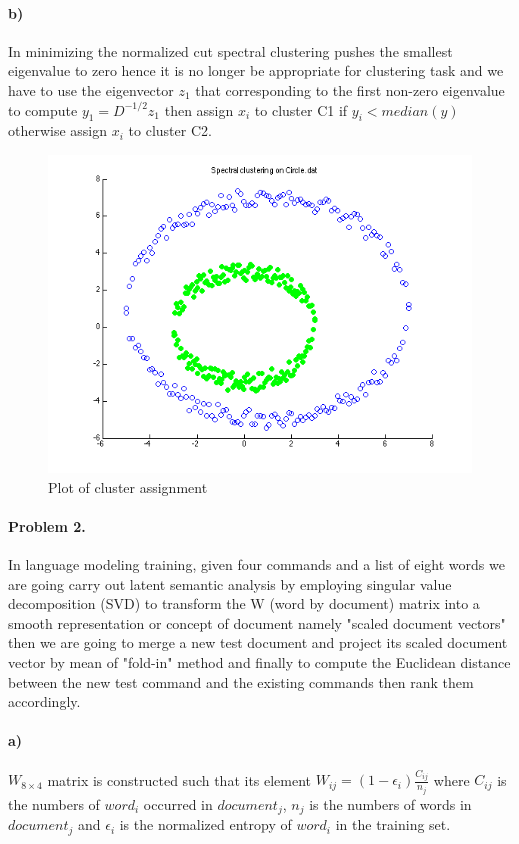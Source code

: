 \documentclass[a4paper]{article}
\begin{document}
\paragraph{b)} In minimizing the normalized cut spectral clustering pushes the smallest eigenvalue to zero hence it is no longer be appropriate for clustering task and we have to use the eigenvector $z_1$ that corresponding to the first non-zero eigenvalue to compute $y_1=D^{-1/2} z_1$ then assign $x_i$ to cluster C1 if $y_i < median (y)$ otherwise assign $x_i$ to cluster C2.

  \begin{figure}[H]
    \centering
      \includegraphics[scale=.47]{images/1.png}
    \caption{Plot of cluster assignment}
  \end{figure}

\paragraph{Problem 2.} In language modeling training, given four commands and a list of eight words we are going carry out latent semantic analysis by employing singular value decomposition (SVD) to transform the W (word by document) matrix into a smooth representation or concept of document namely "scaled document vectors" then we are going to merge a new test document and project its scaled document vector by mean of "fold-in" method and finally to compute the Euclidean distance between the new test command and the existing commands then rank them accordingly.

\paragraph{a)} $W_{8\times4}$ matrix is constructed such that its element $W_{ij} = (1-\epsilon_i)\frac{C_{ij}}{n_j}$ where $C_{ij}$ is the numbers of $word_i$ occurred in $document_j$, $n_j$ is the numbers of words in $document_j$ and $\epsilon_i$ is the normalized entropy of $word_i$ in the training set.
\end{document}
